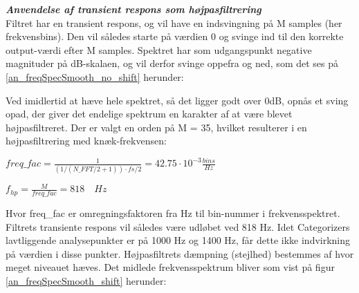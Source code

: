 \newpage
\textbf{\textit{Anvendelse af transient respons som højpasfiltrering}}\\ \label{intlyd:analyzer:smooth_hp}
Filtret har en transient respons, og vil have en indsvingning på M samples (her frekvensbins). Den vil således starte på værdien 0 og svinge ind til den korrekte output-værdi efter M samples. Spektret har som udgangspunkt negative magnituder på dB-skalaen, og vil derfor svinge oppefra og ned, som det ses på \ref{an_freqSpecSmooth_no_shift} herunder:


Ved imidlertid at hæve hele spektret, så det ligger godt over 0dB, opnås et sving opad, der giver det endelige spektrum en karakter af at være blevet højpasfiltreret. Der er valgt en orden på M = 35, hvilket resulterer i en højpasfiltrering med knæk-frekvensen:
\begin{center}
$ freq\_ fac=\frac { 1 }{ \left( { 1 }/{ { \left( N\_ FFT/2+1 \right)  } } \right) \cdot { fs }/{ 2 } } =42.75\cdot { 10 }^{ -3 }\frac { bins }{ Hz } $
\end{center}
\begin{center}
${ f }_{ hp }=\frac { M }{ freq\_ fac } =818\quad Hz $
\end{center} 

Hvor freq\_fac er omregningsfaktoren fra Hz til bin-nummer i frekvensspektret. Filtrets transiente respons vil således være udløbet ved 818 Hz. Idet Categorizers lavtliggende analysepunkter er på 1000 Hz og 1400 Hz, får dette ikke indvirkning på værdien i disse punkter. Højpasfiltrets dæmpning (stejlhed) bestemmes af hvor meget niveauet hæves. Det midlede frekvensspektrum bliver som vist på figur \ref{an_freqSpecSmooth_shift} herunder:


